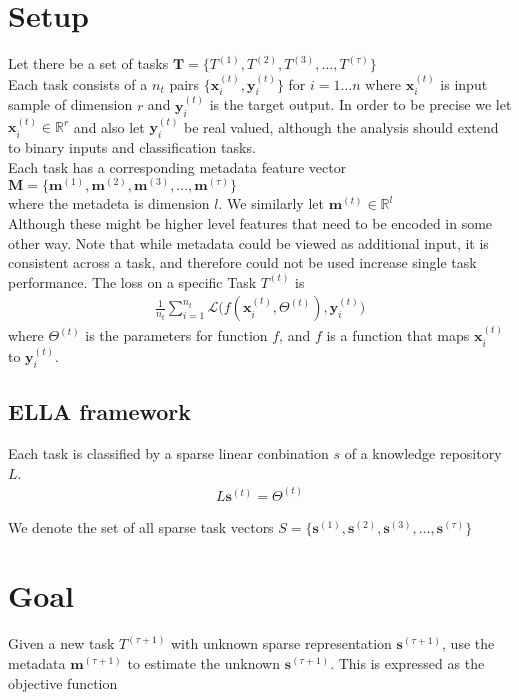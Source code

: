 \documentclass{article} %
\newcommand{\Tt}[1]{T^{(#1)}}
\newcommand{\Mt}[1]{\textbf{m}^{(#1)}}
\newcommand{\st}[1]{\textbf{s}^{(#1)}}
\newcommand{\Th}[1]{\Theta^{(#1)}}
\newcommand{\xit}[2]{\textbf{x}_{#1}^{(#2)}}
\newcommand{\yit}[2]{\textbf{y}_{#1}^{(#2)}}
\begin{document}
\section{Setup}
Let there be a set of tasks $\bm{T} =\{ \Tt{1} ,\Tt{2} ,\Tt{3}, \dots, \Tt{\tau}    \}$ \\
Each task consists of a $n_t$ pairs $\{\xit{i}{t},\yit{i}{t}\}$ for $i={1 \dots n}$ where $\xit{i}{t}$ is input sample of dimension $r$ and $\yit{i}{t}$ is the target output. In order to be precise we let $\xit{i}{t} \in \mathbb{R}^r$ and also let $\yit{i}{t}$ be real valued, although the analysis should extend to binary inputs and classification tasks.\\ %
Each task has a corresponding metadata feature vector $\bm{M} =\{ \Mt{1} ,\Mt{2} ,\Mt{3}, \dots, \Mt{\tau}    \}$ \\
where the metadeta is dimension $l$. We similarly let $\Mt{t} \in \mathbb{R}^l$\\ Although these might be higher level features that need to be encoded in some other way. Note that while metadata could be viewed as additional input, it is consistent across a task, and therefore could not be used increase single task performance.
The loss on a specific Task $\Tt{t}$ is 
\begin{eqnarray}
	\frac{1}{n_t} \sum_{i=1}^{n_t} \mathcal{L}  \big(  f(\xit{i}{t}, \Th{t}) , \yit{i}{t} \big)
\end{eqnarray}
where $\Th{t}$ is the parameters for function $f$, and $f$ is a function that maps $\xit{i}{t}$ to $\yit{i}{t}$.


\subsection{ELLA framework}
Each task is classified by a sparse linear conbination $s$ of a knowledge repository $L$.
\begin{eqnarray}
	L\st{t} = \Th{t} 
\end{eqnarray}

We denote the set of all sparse task vectors  $S =\{ \st{1} ,\st{2} ,\st{3}, \dots, \st{\tau}    \}$ \\



\section{Goal}
Given a new task $\Tt{\tau+1}$ with unknown sparse representation $\st{\tau+1}$, use the metadata $\Mt{\tau+1}$ to estimate the unknown $\st{\tau+1}$. This is expressed as the objective function 
\end{document}
